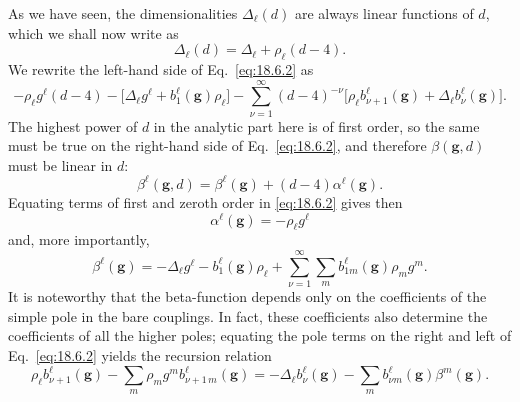 As we have seen, the dimensionalities $\Delta_\ell(d)$ are always linear functions of $d$, which we shall now write as
\begin{equation}
\Delta_\ell(d)=\Delta_\ell+\rho_\ell(d-4).
\tag{18.6.5}\label{eq:18.6.5}
\end{equation}
We rewrite the left-hand side of Eq.~\eqref{eq:18.6.2} as
\[
-\rho_\ell g^\ell(d-4)
-\bigl[\Delta_\ell g^\ell+b_1^\ell(\mathbf{g})\rho_\ell\bigr]
-\sum_{\nu=1}^{\infty}(d-4)^{-\nu}
\bigl[\rho_\ell b_{\nu+1}^\ell(\mathbf{g})
+\Delta_\ell b_\nu^\ell(\mathbf{g})\bigr].
\]
The highest power of $d$ in the analytic part here is of first order, so the same must be true on the right-hand side of Eq.~\eqref{eq:18.6.2}, and therefore $\beta(\mathbf{g},d)$ must be linear in $d$:
\begin{equation}
\beta^\ell(\mathbf{g},d)=\beta^\ell(\mathbf{g})+(d-4)\alpha^\ell(\mathbf{g}).
\tag{18.6.6}\label{eq:18.6.6}
\end{equation}
Equating terms of first and zeroth order in \eqref{eq:18.6.2} gives then
\begin{equation}
\alpha^\ell(\mathbf{g})=-\rho_\ell g^\ell
\tag{18.6.7}\label{eq:18.6.7}
\end{equation}
and, more importantly,
\begin{equation}
\beta^\ell(\mathbf{g})=-\Delta_\ell g^\ell-b_1^\ell(\mathbf{g})\rho_\ell
+\sum_{\nu=1}^{\infty}\sum_m b_{1m}^\ell(\mathbf{g})\rho_m g^m.
\tag{18.6.8}\label{eq:18.6.8}
\end{equation}
It is noteworthy that the beta-function depends only on the coefficients of the simple pole in the bare couplings. In fact, these coefficients also determine the coefficients of all the higher poles; equating the pole terms on the right and left of Eq.~\eqref{eq:18.6.2} yields the recursion relation
\begin{equation}
\rho_\ell b_{\nu+1}^\ell(\mathbf{g})
-\sum_m\rho_m g^m b_{\nu+1\,m}^\ell(\mathbf{g})
=-\Delta_\ell b_\nu^\ell(\mathbf{g})
-\sum_m b_{\nu m}^\ell(\mathbf{g})\beta^m(\mathbf{g}).
\tag{18.6.9}\label{eq:18.6.9}
\end{equation}

